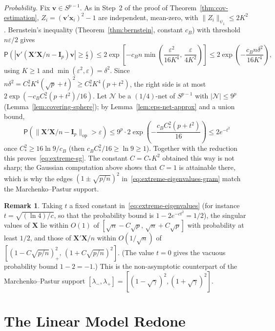 \documentclass[12pt,a4paper]{article}
\makeatletter
\theoremstyle{definition}
\newtheorem{remark}[theorem]{Remark}
\renewenvironment{proof}[1][\proofname]{\par
  \pushQED{\qed}%
  \normalfont \topsep6\p@\@plus6\p@\relax
  \trivlist
  \item[\hskip\labelsep\bfseries #1\@addpunct{.}]\ignorespaces
}{%
  \popQED\endtrivlist\@endpefalse
}
\newcommand\prb{\mathsf{P}}
\newcommand{\bX}{\mathbf{X}}
\newcommand{\bx}{\mathbf{x}}
\newcommand{\bI}{\mathbf{I}}
\newcommand{\bv}{\mathbf{v}}
\newcommand{\calN}{\mathcal{N}}
\newcommand{\opnorm}[1]{\|#1\|_{\mathrm{op}}}
\makeatother
\begin{document}
\begin{proof}
\emph{Probability.} Fix $\bv \in S^{p-1}$. As in Step~2 of the proof of Theorem~\ref{thm:cov-estimation}, $Z_i = (\bv'\bx_i)^2 - 1$ are independent, mean-zero, with $\|Z_i\|_{\psi_1} \leqslant 2K^2$. Bernstein's inequality (Theorem~\ref{thm:bernstein}, constant $c_B$) with threshold $n\varepsilon/2$ gives
\[
\prb\!\left(|\bv'(\bX'\bX/n - \bI_p)\bv| \geqslant \tfrac{\varepsilon}{2}\right) \leqslant 2\exp\!\left[-c_Bn\min\!\left(\frac{\varepsilon^2}{16K^4},\,\frac{\varepsilon}{4K^2}\right)\right] \leqslant 2\exp\!\left(-\frac{c_Bn\delta^2}{16K^4}\right),
\]
using $K \geqslant 1$ and $\min(\varepsilon^2, \varepsilon) = \delta^2$. Since $n\delta^2 = C_*^2K^4(\sqrt{p} + t)^2 \geqslant C_*^2K^4(p + t^2)$, the right side is at most $2\exp(-c_BC_*^2(p + t^2)/16)$. Let $\calN$ be a $(1/4)$-net of $S^{p-1}$ with $|\calN| \leqslant 9^p$ (Lemma~\ref{lem:covering-sphere}); by Lemma~\ref{lem:eps-net-approx} and a union bound,
\[
\prb\!\left(\opnorm{\bX'\bX/n - \bI_p} > \varepsilon\right) \leqslant 9^p\cdot 2\exp\!\left(-\frac{c_BC_*^2(p + t^2)}{16}\right) \leqslant 2e^{-t^2}
\]
once $C_*^2 \geqslant 16\ln 9/c_B$ (then $c_BC_*^2/16 \geqslant \ln 9 \geqslant 1$). Together with the reduction this proves~\eqref{eq:extreme-sg}. The constant $C = C_*K^2$ obtained this way is not sharp; the Gaussian computation above shows that $C = 1$ is attainable there, which is why the edges $(1 \pm \sqrt{p/n})^2$ in~\eqref{eq:extreme-eigenvalues-gram} match the Marchenko--Pastur support.
\end{proof}

\begin{remark}
Taking $t$ a fixed constant in~\eqref{eq:extreme-eigenvalues} (for instance $t = \sqrt{(\ln 4)/c}$, so that the probability bound is $1 - 2e^{-ct^2} = 1/2$), the singular values of $\bX$ lie within $O(1)$ of $[\sqrt{n} - C\sqrt{p},\, \sqrt{n} + C\sqrt{p}]$ with probability at least $1/2$, and those of $\bX'\bX/n$ within $O(1/\sqrt{n})$ of $[(1 - C\sqrt{p/n})_+^2,\, (1 + C\sqrt{p/n})^2]$. (The value $t = 0$ gives the vacuous probability bound $1 - 2 = -1$.) This is the non-asymptotic counterpart of the Marchenko--Pastur support $[\lambda_-,\lambda_+] = [(1-\sqrt\gamma)^2, (1+\sqrt\gamma)^2]$.
\end{remark}

\newpage
\part{The Linear Model Redone}\label{part:linear-model}
\end{document}
